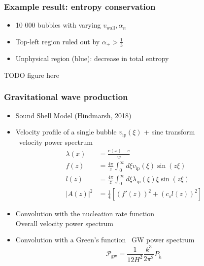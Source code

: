 \begin{frame}
    \frametitle{Example result: entropy conservation}
    \begin{minipage}[t]{0.48\linewidth}
        \begin{itemize}
            \item 10 000 bubbles with varying $v_\text{wall}, \alpha_n$
            \item Top-left region ruled out by $\alpha_+ > \frac{1}{3}$
            \item Unphysical region (blue): decrease in total entropy
        \end{itemize}%
    \end{minipage}%
    \hfill%
    \begin{minipage}[t]{0.48\linewidth}%
        TODO figure here
    \end{minipage}
\end{frame}

\begin{frame}
    \frametitle{Gravitational wave production}
    \begin{itemize}
        \item Sound Shell Model (Hindmarsh, 2018)
        \item Velocity profile of a single bubble $v_\text{ip}(\xi)$ + sine transform \\ \textrightarrow \ velocity power spectrum
        \begin{align}
            \lambda(x) &= \frac{e(x) - \bar{e}}{\bar{w}} \\
            f(z) &= \frac{4 \pi}{z} \int_0^\infty d\xi v_\text{ip}(\xi) \sin(z\xi) \\
            l(z) &= \frac{4 \pi}{z} \int_0^\infty d\xi \lambda_\text{ip}(\xi) \xi \sin(z\xi) \\
            |A(z)|^2 &= \frac{1}{4} \left[ (f'(z))^2 + (c_s l(z))^2 \right]
        \end{align}
        \item Convolution with the nucleation rate function \\
            \textrightarrow Overall velocity power spectrum
        \item Convolution with a Green's function \textrightarrow \ GW power spectrum
        \begin{equation}
            \mathcal{P}_\text{gw} = \frac{1}{12 H^2} \frac{k^3}{2\pi^2} P_{\dot{h}}
        \end{equation}
    \end{itemize}
\end{frame}

